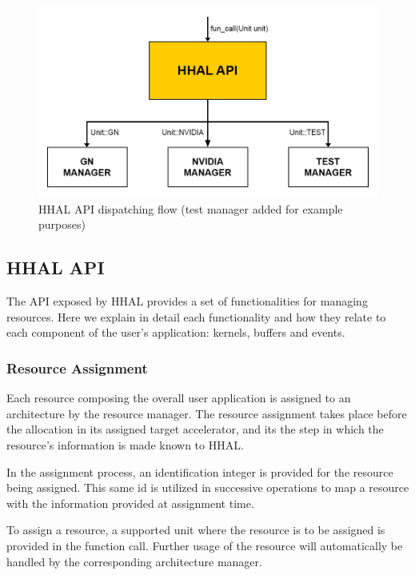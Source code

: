 \begin{figure}[ht]
    \centering
    \includegraphics[width=\textwidth]{img/hhal-dispatcher.png}
    \captionsetup{justification=centering}
    \caption{HHAL API dispatching flow (test manager added for example purposes)}
    \label{fig:hhal_dispatcher}
\end{figure}

\subsection{HHAL API}

The API exposed by HHAL provides a set of functionalities for managing resources. Here we explain in detail each functionality and how they relate to each component of the user's application: kernels, buffers and events.

\subsubsection{Resource Assignment}

Each resource composing the overall user application is assigned to an architecture by the resource manager. The resource assignment takes place before the allocation in its assigned target accelerator, and its the step in which the resource's information is made known to HHAL.

In the assignment process, an identification integer is provided for the resource being assigned. This same id is utilized in successive operations to map a resource with the information provided at assignment time.

To assign a resource, a supported unit where the resource is to be assigned is provided in the function call. Further usage of the resource will automatically be handled by the corresponding architecture manager.

